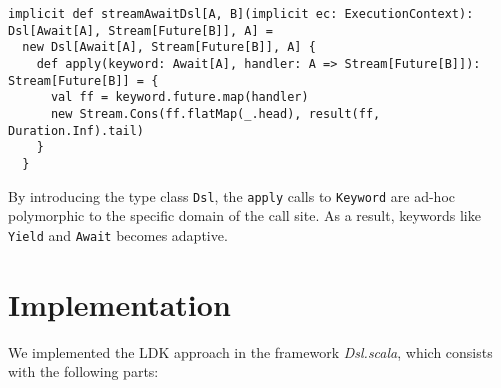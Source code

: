 \begin{lstlisting}[caption={The \lstinline{Dsl} type class instance of \lstinline{Await} for creating asynchronous generators},label={Await-async-generator-instance}]
implicit def streamAwaitDsl[A, B](implicit ec: ExecutionContext): Dsl[Await[A], Stream[Future[B]], A] =
  new Dsl[Await[A], Stream[Future[B]], A] {
    def apply(keyword: Await[A], handler: A => Stream[Future[B]]): Stream[Future[B]] = {
      val ff = keyword.future.map(handler)
      new Stream.Cons(ff.flatMap(_.head), result(ff, Duration.Inf).tail)
    }
  }
\end{lstlisting}

By introducing the type class \lstinline{Dsl}, the \lstinline{apply} calls to \lstinline{Keyword} are ad-hoc polymorphic to the specific domain of the call site. As a result, keywords like \lstinline{Yield} and \lstinline{Await} becomes adaptive.

\section{Implementation}\label{Implementation}

We implemented the LDK approach in the framework \textit{Dsl.scala}, which consists with the following parts:

